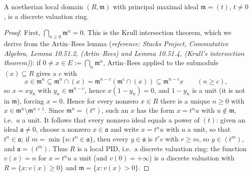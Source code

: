 \begin{lemma}
\label{lem:pcb-principal-ideal-dvr}
A noetherian local domain \((R,\mathfrak m)\) with principal
maximal ideal \(\mathfrak m=(t)\), \(t\neq0\), is a discrete
valuation ring.
\mathlibok\ 
\end{lemma}
\begin{proof}
First, \(\bigcap_{n\geq0}\mathfrak m^n=0\).  This is the Krull
intersection theorem, which we derive from the Artin--Rees lemma
(\emph{reference: Stacks Project, Commutative Algebra, Lemma
10.51.2,  (Artin--Rees) and Lemma 10.51.4,
 (Krull's intersection theorem)}): if
\(0\neq x\in E:=\bigcap_n\mathfrak m^n\), Artin--Rees applied to
the submodule \((x)\subseteq R\) gives a \(c\) with
\[
 x\in\mathfrak m^n\subseteq\mathfrak m^n\cap(x)
 =\mathfrak m^{n-c}(\mathfrak m^c\cap(x))\subseteq\mathfrak m^{n-c}x
 \qquad(n\geq c),
\]
so \(x=xy_n\) with \(y_n\in\mathfrak m^{n-c}\), hence
\(x(1-y_n)=0\), and \(1-y_n\) is a unit (it is not in
\(\mathfrak m\)), forcing \(x=0\).  Hence for every nonzero
\(x\in R\) there is a unique \(n\geq0\) with
\(x\in\mathfrak m^n\setminus\mathfrak m^{n+1}\).  Since
\(\mathfrak m^n=(t^n)\), such an \(x\) has the form \(x=t^nu\) with
\(u\notin\mathfrak m\), i.e.\ \(u\) a unit.  It follows that every
nonzero ideal equals a power of \((t)\): given an ideal
\(\mathfrak a\neq0\), choose a nonzero \(x\in\mathfrak a\) and
write \(x=t^nu\) with \(u\) a unit, so that \(t^n\in\mathfrak a\);
if \(m=\min\{n:t^n\in\mathfrak a\}\), then every
\(y\in\mathfrak a\) is \(t^rv\) with \(r\geq m\), so
\(y\in(t^m)\), and \(\mathfrak a=(t^m)\).  Thus \(R\) is a local
PID, i.e.\ a discrete valuation ring: the function \(v(x)=n\) for
\(x=t^nu\) a unit (and \(v(0)=+\infty\)) is a discrete valuation
with \(R=\{x:v(x)\geq0\}\) and
\(\mathfrak m=\{x:v(x)>0\}\).
\end{proof}

